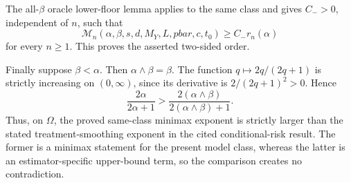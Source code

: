 The all-\(\beta\) oracle lower-floor lemma applies to the same class and gives \(C_->0\), independent of \(n\), such that
\[
\mathcal M_n(\alpha,\beta,s,d,M_Y,L,pbar,c,t_0)
\ge C_-r_n(\alpha)
\]
for every \(n\ge1\). This proves the asserted two-sided order.

Finally suppose \(\beta<\alpha\). Then \(\alpha\wedge\beta=\beta\). The function \(q\mapsto 2q/(2q+1)\) is strictly increasing on \((0,\infty)\), since its derivative is \(2/(2q+1)^2>0\). Hence
\[
\frac{2\alpha}{2\alpha+1}
>
\frac{2(\alpha\wedge\beta)}{2(\alpha\wedge\beta)+1}.
\]
Thus, on \(\Omega\), the proved same-class minimax exponent is strictly larger than the stated treatment-smoothing exponent in the cited conditional-risk result. The former is a minimax statement for the present model class, whereas the latter is an estimator-specific upper-bound term, so the comparison creates no contradiction.